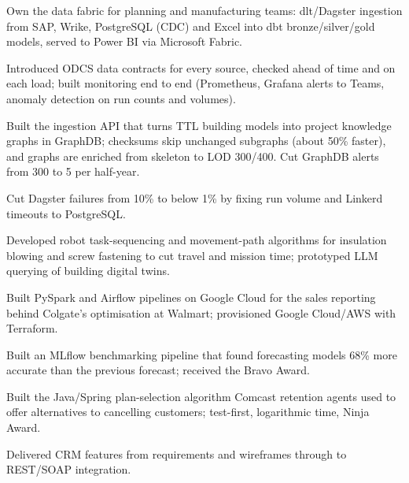 \documentclass[11pt,a4paper]{article}
\begin{document}
\begin{cvitems}
  \item Own the data fabric for planning and manufacturing teams: dlt/Dagster ingestion from SAP, Wrike, PostgreSQL (CDC) and Excel into dbt bronze/silver/gold models, served to Power BI via Microsoft Fabric.
  \item Introduced ODCS data contracts for every source, checked ahead of time and on each load; built monitoring end to end (Prometheus, Grafana alerts to Teams, anomaly detection on run counts and volumes).
  \item Built the ingestion API that turns TTL building models into project knowledge graphs in GraphDB; checksums skip unchanged subgraphs (about 50\% faster), and graphs are enriched from skeleton to LOD 300/400. Cut GraphDB alerts from 300 to 5 per half-year.
  \item Cut Dagster failures from 10\% to below 1\% by fixing run volume and Linkerd timeouts to PostgreSQL.
  \item Developed robot task-sequencing and movement-path algorithms for insulation blowing and screw fastening to cut travel and mission time; prototyped LLM querying of building digital twins.
\end{cvitems}
\rolespace
{}
\begin{cvitems}
  \item Built PySpark and Airflow pipelines on Google Cloud for the sales reporting behind Colgate's optimisation at Walmart; provisioned Google Cloud/AWS with Terraform.
  \item Built an MLflow benchmarking pipeline that found forecasting models 68\% more accurate than the previous forecast; received the Bravo Award.
\end{cvitems}
\rolespace
{}
\begin{cvitems}
  \item Built the Java/Spring plan-selection algorithm Comcast retention agents used to offer alternatives to cancelling customers; test-first, logarithmic time, Ninja Award.
  \item Delivered CRM features from requirements and wireframes through to REST/SOAP integration.
\end{cvitems}
\end{document}
